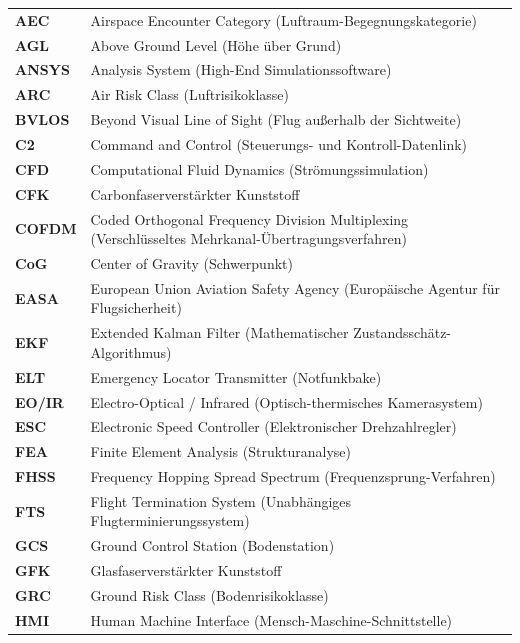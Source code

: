 \documentclass[12pt,a4paper,oneside]{report}
\begin{document}
\begin{longtable}{p{2.5cm} p{11cm}}
    \textbf{AEC}    & Airspace Encounter Category (Luftraum-Begegnungskategorie) \\
    \textbf{AGL}    & Above Ground Level (Höhe über Grund) \\
    \textbf{ANSYS}  & Analysis System (High-End Simulationssoftware) \\
    \textbf{ARC}    & Air Risk Class (Luftrisikoklasse) \\
    \textbf{BVLOS}  & Beyond Visual Line of Sight (Flug außerhalb der Sichtweite) \\
    \textbf{C2}     & Command and Control (Steuerungs- und Kontroll-Datenlink) \\
    \textbf{CFD}    & Computational Fluid Dynamics (Strömungssimulation) \\
    \textbf{CFK}    & Carbonfaserverstärkter Kunststoff \\
    \textbf{COFDM}  & Coded Orthogonal Frequency Division Multiplexing (Verschlüsseltes Mehrkanal-Übertragungsverfahren) \\
    \textbf{CoG}    & Center of Gravity (Schwerpunkt) \\
    \textbf{EASA}   & European Union Aviation Safety Agency (Europäische Agentur für Flugsicherheit) \\
    \textbf{EKF}    & Extended Kalman Filter (Mathematischer Zustandsschätz-Algorithmus) \\
    \textbf{ELT}    & Emergency Locator Transmitter (Notfunkbake) \\
    \textbf{EO/IR}  & Electro-Optical / Infrared (Optisch-thermisches Kamerasystem) \\
    \textbf{ESC}    & Electronic Speed Controller (Elektronischer Drehzahlregler) \\
    \textbf{FEA}    & Finite Element Analysis (Strukturanalyse) \\
    \textbf{FHSS}   & Frequency Hopping Spread Spectrum (Frequenzsprung-Verfahren) \\
    \textbf{FTS}    & Flight Termination System (Unabhängiges Flugterminierungssystem) \\
    \textbf{GCS}    & Ground Control Station (Bodenstation) \\
    \textbf{GFK}    & Glasfaserverstärkter Kunststoff \\
    \textbf{GRC}    & Ground Risk Class (Bodenrisikoklasse) \\
    \textbf{HMI}    & Human Machine Interface (Mensch-Maschine-Schnittstelle) \\

\end{longtable}
\end{document}

